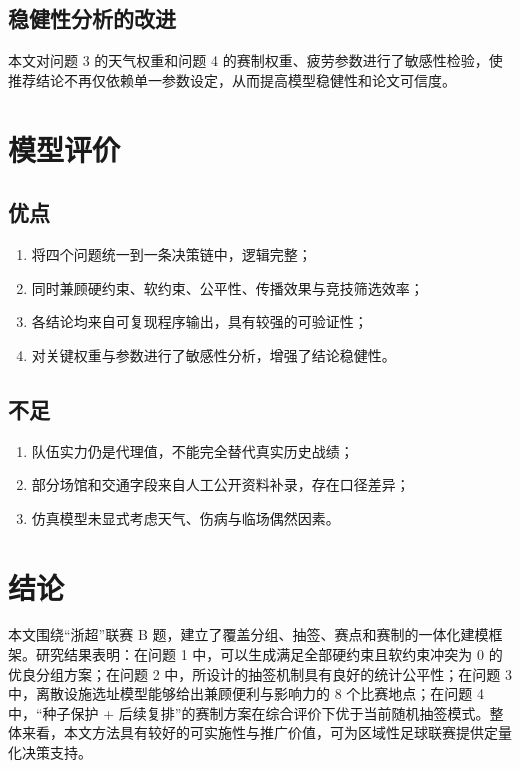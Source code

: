 \documentclass[UTF8,a4paper,12pt]{ctexart}
\begin{document}
\subsection{稳健性分析的改进}

本文对问题 3 的天气权重和问题 4 的赛制权重、疲劳参数进行了敏感性检验，使推荐结论不再仅依赖单一参数设定，从而提高模型稳健性和论文可信度。

\section{模型评价}

\subsection{优点}

\begin{enumerate}
  \item 将四个问题统一到一条决策链中，逻辑完整；
  \item 同时兼顾硬约束、软约束、公平性、传播效果与竞技筛选效率；
  \item 各结论均来自可复现程序输出，具有较强的可验证性；
  \item 对关键权重与参数进行了敏感性分析，增强了结论稳健性。
\end{enumerate}

\subsection{不足}

\begin{enumerate}
  \item 队伍实力仍是代理值，不能完全替代真实历史战绩；
  \item 部分场馆和交通字段来自人工公开资料补录，存在口径差异；
  \item 仿真模型未显式考虑天气、伤病与临场偶然因素。
\end{enumerate}

\section{结论}

本文围绕“浙超”联赛 B 题，建立了覆盖分组、抽签、赛点和赛制的一体化建模框架。研究结果表明：在问题 1 中，可以生成满足全部硬约束且软约束冲突为 0 的优良分组方案；在问题 2 中，所设计的抽签机制具有良好的统计公平性；在问题 3 中，离散设施选址模型能够给出兼顾便利与影响力的 8 个比赛地点；在问题 4 中，“种子保护 + 后续复排”的赛制方案在综合评价下优于当前随机抽签模式。整体来看，本文方法具有较好的可实施性与推广价值，可为区域性足球联赛提供定量化决策支持。
\end{document}
